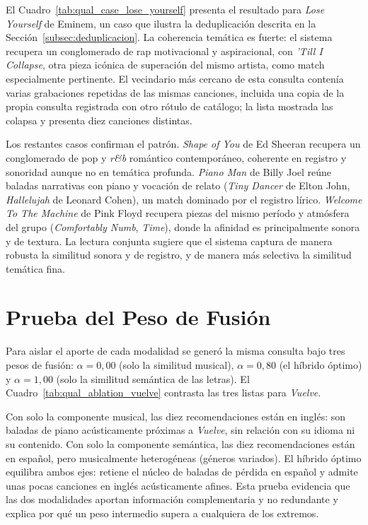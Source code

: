 

El Cuadro~\ref{tab:qual_case_lose_yourself} presenta el resultado para \emph{Lose Yourself} de Eminem, un caso que ilustra la deduplicación descrita en la Sección~\ref{subsec:deduplicacion}. La coherencia temática es fuerte: el sistema recupera un conglomerado de rap motivacional y aspiracional, con \emph{'Till I Collapse}, otra pieza icónica de superación del mismo artista, como match especialmente pertinente. El vecindario más cercano de esta consulta contenía varias grabaciones repetidas de las mismas canciones, incluida una copia de la propia consulta registrada con otro rótulo de catálogo; la lista mostrada las colapsa y presenta diez canciones distintas.



Los restantes casos confirman el patrón. \emph{Shape of You} de Ed Sheeran recupera un conglomerado de pop y \textit{r\&b} romántico contemporáneo, coherente en registro y sonoridad aunque no en temática profunda. \emph{Piano Man} de Billy Joel reúne baladas narrativas con piano y vocación de relato (\emph{Tiny Dancer} de Elton John, \emph{Hallelujah} de Leonard Cohen), un match dominado por el registro lírico. \emph{Welcome To The Machine} de Pink Floyd recupera piezas del mismo período y atmósfera del grupo (\emph{Comfortably Numb}, \emph{Time}), donde la afinidad es principalmente sonora y de textura. La lectura conjunta sugiere que el sistema captura de manera robusta la similitud sonora y de registro, y de manera más selectiva la similitud temática fina.

\section{Prueba del Peso de Fusión}
\label{sec:ablacion-alpha}

Para aislar el aporte de cada modalidad se generó la misma consulta bajo tres pesos de fusión: $\alpha = 0{,}00$ (solo la similitud musical), $\alpha = 0{,}80$ (el híbrido óptimo) y $\alpha = 1{,}00$ (solo la similitud semántica de las letras). El Cuadro~\ref{tab:qual_ablation_vuelve} contrasta las tres listas para \emph{Vuelve}.



Con solo la componente musical, las diez recomendaciones están en inglés: son baladas de piano acústicamente próximas a \emph{Vuelve}, sin relación con su idioma ni su contenido. Con solo la componente semántica, las diez recomendaciones están en español, pero musicalmente heterogéneas (géneros variados). El híbrido óptimo equilibra ambos ejes: retiene el núcleo de baladas de pérdida en español y admite unas pocas canciones en inglés acústicamente afines. Esta prueba evidencia que las dos modalidades aportan información complementaria y no redundante y explica por qué un peso intermedio supera a cualquiera de los extremos.

